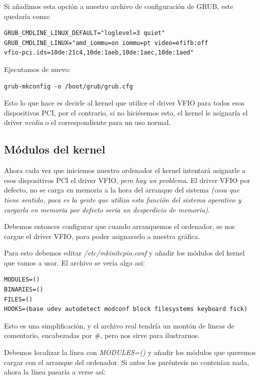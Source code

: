 \documentclass[12pt]{article}
\begin{document}
Si añadimos esta opción a nuestro archivo de configuración de GRUB, este quedaría como:

\begin{lstlisting}[basicstyle=\ttfamily]
GRUB_CMDLINE_LINUX_DEFAULT="loglevel=3 quiet"
GRUB_CMDLINE_LINUX="amd_iommu=on iommu=pt video=efifb:off
vfio-pci.ids=10de:21c4,10de:1aeb,10de:1aec,10de:1aed"
\end{lstlisting}

Ejecutamos de nuevo:

\begin{verbatim}
grub-mkconfig -o /boot/grub/grub.cfg
\end{verbatim}

Esto lo que hace es decirle al kernel que utilice el driver VFIO para todos esos dispositivos PCI, por el contrario, si no hiciésemos esto, el kernel le asignaría el driver \emph{nvidia} o el correspondiente para un uso normal.

\subsection{Módulos del kernel}

Ahora cada vez que iniciemos nuestro ordenador el kernel intentará asignarle a esos dispositivos PCI el driver VFIO, \emph{pero hay un problema}. El driver VFIO por defecto, no se carga en memoria a la hora del arranque del sistema \emph{(cosa que tiene sentido, poca es la gente que utiliza esta función del sistema operativo y cargarla en memoria por defecto sería un desperdicio de memoria)}.

Debemos entonces configurar que cuando arranquemos el ordenador, se nos cargue el driver VFIO, para poder asignarselo a nuestra gráfica.

Para esto debemos editar \emph{/etc/mkinitcpio.conf} y añadir los módulos del kernel que vamos a usar. El archivo se vería algo asi:

\begin{verbatim}
MODULES=()
BINARIES=()
FILES=()
HOOKS=(base udev autodetect modconf block filesystems keyboard fsck)
\end{verbatim}

Esto es una simplificación, y el archivo real tendría un montón de lineas de comentario, encabezadas por \#, pero nos sirve para ilustrarnos.

Debemos localizar la línea con \emph{MODULES=()} y añadir los módulos que queremos cargar con el arranque del ordenador. Si antes los paréntesis no contenían nada, ahora la línea pasaría a verse así:
\end{document}
